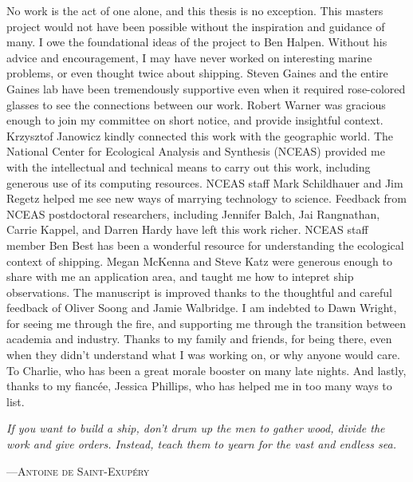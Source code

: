   \approvalpage 
  \copyrightpage


  \begin{acknowledgements}

    No work is the act of one alone, and this thesis is no exception. This masters project would not have been possible without the inspiration and guidance of many. I owe the foundational ideas of the project to Ben Halpen. Without his advice and encouragement, I may have never worked on interesting marine problems, or even thought twice about shipping. Steven Gaines and the entire Gaines lab have been tremendously supportive even when it required rose-colored glasses to see the connections between our work. Robert Warner was gracious enough to join my committee on short notice, and provide insightful context. Krzysztof Janowicz kindly connected this work with the geographic world. The National Center for Ecological Analysis and Synthesis (NCEAS) provided me with the intellectual and technical means to carry out this work, including generous use of its computing resources. NCEAS staff Mark Schildhauer and Jim Regetz helped me see new ways of marrying technology to science. Feedback from NCEAS postdoctoral researchers, including Jennifer Balch, Jai Rangnathan, Carrie Kappel, and Darren Hardy have left this work richer. NCEAS staff member Ben Best has been a wonderful resource for understanding the ecological context of shipping. Megan McKenna and Steve Katz were generous enough to share with me an application area, and taught me how to intepret ship observations. The manuscript is improved thanks to the thoughtful and careful feedback of Oliver Soong and Jamie Walbridge. I am indebted to Dawn Wright, for seeing me through the fire, and supporting me through the transition between academia and industry. Thanks to my family and friends, for being there, even when they didn't understand what I was working on, or why anyone would care. To Charlie, who has been a great morale booster on many late nights. And lastly, thanks to my fiancée, Jessica Phillips, who has helped me in too many ways to list.

    \setlength{\epigraphwidth}{.9\textwidth}
    \setlength{\epigraphrule}{0pt}
    \epigraph{\textit{If you want to build a ship, don't drum up the men to gather wood, divide the work and give orders. Instead, teach them to yearn for the vast and endless sea.}}
             {---\textsc{Antoine de Saint-Exupéry}}
  \end{acknowledgements}
\ssp

